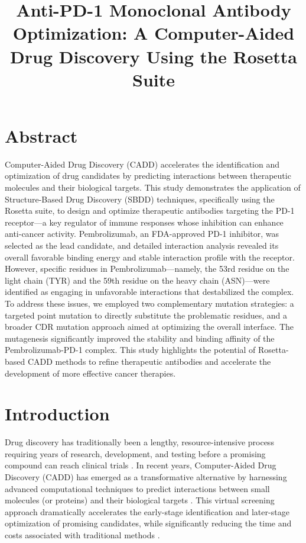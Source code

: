 \documentclass[11pt]{article}
\begin{document}
\title{Anti-PD-1 Monoclonal Antibody Optimization: A Computer-Aided Drug Discovery Using the Rosetta Suite}
\maketitle

\section{Abstract}

Computer-Aided Drug Discovery (CADD) accelerates the identification and optimization of drug candidates by predicting interactions between therapeutic molecules and their biological targets. This study demonstrates the application of Structure-Based Drug Discovery (SBDD) techniques, specifically using the Rosetta suite, to design and optimize therapeutic antibodies targeting the PD-1 receptor—a key regulator of immune responses whose inhibition can enhance anti-cancer activity. Pembrolizumab, an FDA-approved PD-1 inhibitor, was selected as the lead candidate, and detailed interaction analysis revealed its overall favorable binding energy and stable interaction profile with the receptor. However, specific residues in Pembrolizumab—namely, the 53rd residue on the light chain (TYR) and the 59th residue on the heavy chain (ASN)—were identified as engaging in unfavorable interactions that destabilized the complex. To address these issues, we employed two complementary mutation strategies: a targeted point mutation to directly substitute the problematic residues, and a broader CDR mutation approach aimed at optimizing the overall interface. The mutagenesis significantly improved the stability and binding affinity of the Pembrolizumab-PD-1 complex. This study highlights the potential of Rosetta-based CADD methods to refine therapeutic antibodies and accelerate the development of more effective cancer therapies.

\section{Introduction}

Drug discovery has traditionally been a lengthy, resource-intensive process requiring years of research, development, and testing before a promising compound can reach clinical trials \cite{DiMasi2003,Paul2010}. In recent years, Computer-Aided Drug Discovery (CADD) has emerged as a transformative alternative by harnessing advanced computational techniques to predict interactions between small molecules (or proteins) and their biological targets \cite{Kitchen2004,Lionta2014}.  This virtual screening approach dramatically accelerates the early-stage identification and later-stage optimization of promising candidates, while significantly reducing the time and costs associated with traditional methods \cite{Sliwoski2014}.
\end{document}
